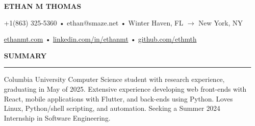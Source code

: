 \documentclass[11pt,letterpaper]{article}
\begin{document}
\begingroup
\centerline{\MakeUppercase{\LARGE\bf Ethan M Thomas}} \medskip
\endgroup

\begingroup
\centerline{+1(863) 325-5360 • ethan@smaze.net • Winter Haven, FL $\rightarrow$ New York, NY}
\endgroup
\par

\begingroup
\centerline{\href{www.ethanmt.com}{ethanmt.com} • \href{https://www.linkedin.com/in/ethanmt/}{linkedin.com/in/ethanmt} • \href{https://github.com/ethmth}{github.com/ethmth}}
\endgroup
\par


\medskip
\MakeUppercase{{\bf Summary}} %
\medskip
\hrule %
\begin{list}{}{\setlength{\leftmargin}{0em}}
    \item
          {Columbia University Computer Science student with research experience, graduating in May of 2025.
          Extensive experience developing web front-ends with React, mobile applications with Flutter, and back-ends using Python.
          Loves Linux, Python/shell scripting, and automation.
          Seeking a Summer 2024 Internship in Software Engineering.
          }
\end{list}


\end{document}
